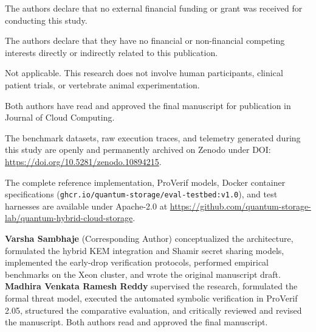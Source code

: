 \documentclass[sn-mathphys,Numbered]{sn-jnl}%
\theoremstyle{thmstyleone}%
\theoremstyle{thmstyletwo}%
\theoremstyle{thmstylethree}%
\begin{document}
The authors declare that no external financial funding or grant was received for conducting this study.

The authors declare that they have no financial or non-financial competing interests directly or indirectly related to this publication.

Not applicable. This research does not involve human participants, clinical patient trials, or vertebrate animal experimentation.

Both authors have read and approved the final manuscript for publication in Journal of Cloud Computing.

The benchmark datasets, raw execution traces, and telemetry generated during this study are openly and permanently archived on Zenodo under DOI: \url{https://doi.org/10.5281/zenodo.10894215}.

The complete reference implementation, ProVerif models, Docker container specifications (\texttt{ghcr.io/quantum-storage/eval-testbed:v1.0}), and test harnesses are available under Apache-2.0 at \url{https://github.com/quantum-storage-lab/quantum-hybrid-cloud-storage}.

\textbf{Varsha Sambhaje} (Corresponding Author) conceptualized the architecture, formulated the hybrid KEM integration and Shamir secret sharing models, implemented the early-drop verification protocols, performed empirical benchmarks on the Xeon cluster, and wrote the original manuscript draft. \textbf{Madhira Venkata Ramesh Reddy} supervised the research, formulated the formal threat model, executed the automated symbolic verification in ProVerif 2.05, structured the comparative evaluation, and critically reviewed and revised the manuscript. Both authors read and approved the final manuscript.
\end{document}
